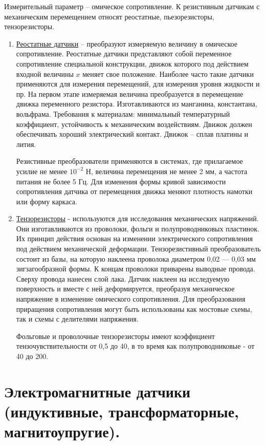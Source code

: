 \documentclass[unicode, 12pt, a4paper, oneside]{article}
\begin{document}
Измерительный параметр – омическое сопротивление. К резистивным датчикам с механическим перемещением относят реостатные, пьезорезисторы, тензорезисторы.
\begin{enumerate}
\item \underline{Реостатные датчики} – преобразуют измеряемую величину в омическое сопротивление. Реостатные датчики представляют собой переменное сопротивление специальной конструкции, движок которого под действием входной величины $x$ меняет свое положение.  Наиболее часто такие датчики применяются для измерения перемещений, для измерения уровня жидкости и пр. На первом этапе измеряемая величина преобразуется в перемещение движка переменного резистора. Изготавливаются из манганина, константана, вольфрама. Требования к материалам: минимальный температурный коэффициент, устойчивость к механическим воздействиям. Движок должен обеспечивать хороший электрический контакт. Движок – сплав платины и лития.

Резистивные преобразователи применяются в системах, где прилагаемое усилие не менее $10^{-2}$ Н, величина перемещения не менее 2 мм, а частота питания не более 5 Гц. Для изменения формы кривой зависимости сопротивления датчика от перемещения движка меняют плотность намотки или форму каркаса.

\item \underline{Тензорезисторы} - используются для исследования механических напряжений. Они изготавливаются из проволоки, фольги и полупроводниковых пластинок. Их принцип действия основан на изменении электрического сопротивления под действием механической деформации. Тензорезистивный преобразователь состоит из базы, на которую наклеена проволока диаметром 0,02 — 0,03 мм зигзагообразной формы. К концам проволоки приварены выводные провода. Сверху провода нанесен слой лака. Датчик наклеен на исследуемую поверхность и вместе с ней деформируется, преобразуя механическое напряжение в изменение омического сопротивления. Для преобразования приращения сопротивления могут быть использованы как мостовые схемы, так и схемы с делителями напряжения.

Фольговые и проволочные тензорезисторы имеют коэффициент тензочувствительности от 0,5 до 40, в то время как полупроводниковые - от 40 до 200.
\end{enumerate}

\section{Электромагнитные датчики (индуктивные, трансформаторные, магнитоупругие).}
\end{document}
